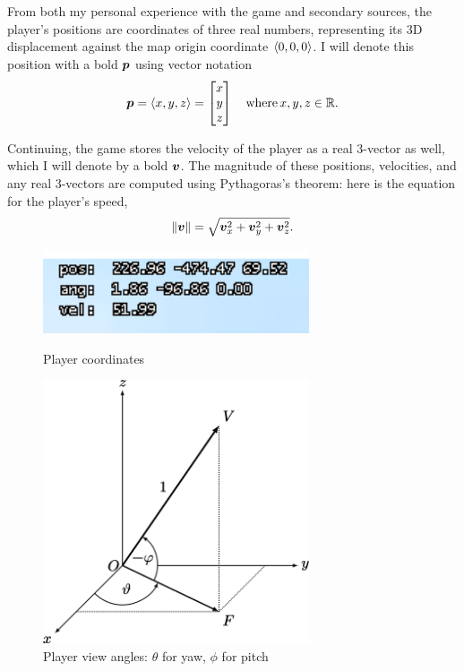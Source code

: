 From both my personal experience with the game and secondary sources, the player's positions are coordinates of three real numbers, representing its 3D displacement against the map origin coordinate $\left\langle 0,0,0 \right\rangle$. I will denote this position with a bold $\boldsymbol{p}$ using vector notation
\[
    \boldsymbol{p} = \left\langle x, y, z \right\rangle = \begin{bmatrix}x\\y\\z\end{bmatrix} \quad \text{where} \, x, y, z \in  \mathbb{R}.
\]

Continuing, the game stores the velocity of the player as a real 3-vector as well, which I will denote by a bold $\boldsymbol{v}$. The magnitude of these positions, velocities, and any real 3-vectors are computed using Pythagoras's theorem: here is the equation for the player's speed,
\[
    \|\boldsymbol{v}\| = \sqrt{\boldsymbol{v}_x^2+\boldsymbol{v}_y^2+\boldsymbol{v}_z^2}.
\]

\begin{figure}[H]
    \centering
    \begin{minipage}{.5\textwidth}
        \centering
        \includegraphics[width=0.7\textwidth]{assets/1coords.png}
        \caption[Player Coordinates]{Player coordinates}
        \label{fig:1coords}
    \end{minipage}%
    \begin{minipage}{.5\textwidth}
        \centering
         \includegraphics[width=0.7\textwidth]{assets/viewangles.png}
        \caption[Player View Angles]{Player view angles: $\theta$ for yaw, $\phi$ for pitch\footnotemark}
        \label{fig:view_ang}
    \end{minipage}
\end{figure}


